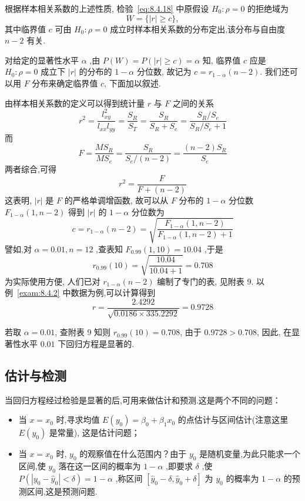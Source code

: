 根据样本相关系数的上述性质, 检验~\eqref{eq:8.4.18} 中原假设 $H_0: \rho=0$ 的拒绝域为 
\begin{equation*}
  W = \{|r| \geq c\},
\end{equation*}
其中临界值 $c$ 可由 $H_0:\rho =0$ 成立时样本相关系数的分布定出,该分布与自由度 $n-2$ 有关.

对给定的显著性水平 $\alpha$ ,由 $P(W)=P(|r|\ge c)=\alpha$ 知, 临界值 $c$ 应是 $H_0:\rho =0$ 成立下 $|r|$ 的分布的 $1-\alpha$ 分位数, 故记为 $c = r_{1-\alpha}(n-2)$. 我们还可以用 $F$ 分布来确定临界值 $c$, 下面加以叙述.

由样本相关系数的定义可以得到统计量 $r$ 与 $F$ 之间的关系
\begin{equation*}
r^{2} =\frac{l_{x y}^{2}}{l_{x x} l_{y y}}=\frac{S_{R}}{S_{T}}=\frac{S_{R}}{S_{R}+S_{e}}=\frac{S_{R} / S_{e}}{S_{R} / S_{e}+1} 
\end{equation*}
而
\begin{equation*}
F=\frac{MS_R}{MS_e}=\frac{S_R}{S_e/\left( n-2 \right)}=\frac{\left( n-2 \right) S_R}{S_e}
\end{equation*}
两者综合,可得
\begin{equation*}
r^2=\frac{F}{F+(n-2)}  
\end{equation*}
这表明, $|r|$ 是 $F$ 的严格单调增函数, 故可以从 $F$ 分布的 $1-\alpha$ 分位数 $F_{1-\alpha}(1,n-2)$ 得到 $|r|$ 的 $1-\alpha$ 分位数为
\begin{equation*}
c=r_{1-\alpha}(n-2)=\sqrt{\frac{F_{1-\alpha}(1, n-2)}{F_{1-\alpha}(1, n-2)+1}}
\end{equation*}
譬如,对 $\alpha =0.01,n=12$ ,查表知 $F_{0.99}(1,10)=10.04$ ,于是
\begin{equation*}
r_{0.99}(10)=\sqrt{\frac{10.04}{10.04+1}}=0.708
\end{equation*}
为实际使用方便, 人们已对 $r_{1-\alpha}(n-2)$ 编制了专门的表, 见附表 9.
以例~\ref{exam:8.4.2} 中数据为例,可以计算得到
\begin{equation*}
r=\frac{2.4292}{\sqrt{0.0186 \times 335.2292}}=0.9728
\end{equation*}

若取 $\alpha =0.01$, 查附表 9 知则 $r_{0.99}(10)=0.708$, 由于 $0.9728>0.708$, 因此, 在显著性水平 $0.01$ 下回归方程是显著的.


\subsection{估计与检测}\label{sec:8.4.5}

当回归方程经过检验是显著的后,可用来做估计和预测.这是两个不同的问题：
\begin{itemize}
    \item 当 $x=x_0$ 时,寻求均值 $E(y_0)=\beta_0+\beta_1 x_0$ 的点估计与区间估计(注意这里 $E(y_0)$ 是常量), 这是估计问题；
    \item 当 $x=x_0$ 时, $y_0$ 的观察值在什么范围内？由于 $y_0$ 是随机变量,为此只能求一个区间,使 $y_0$ 落在这一区间的概率为 $1-\alpha$ ,即要求 $\delta$ ,使 $P(|y_0-\hat{y}_0|<\delta)=1-\alpha$ ,称区间 $\left[\hat{y}_{0}-\delta, \hat{y}_{0}+\delta\right]$ 为 $y_0$ 的概率为 $1-\alpha$ 的预测区间,这是预测问题.
\end{itemize}


